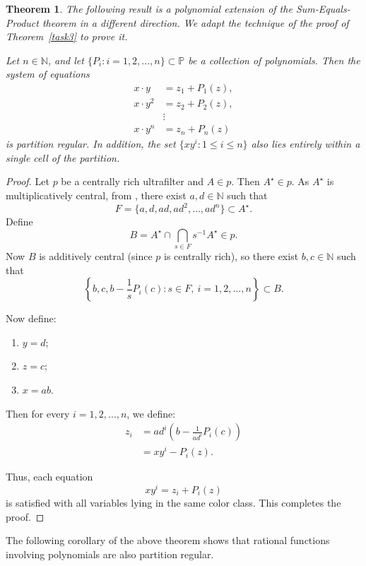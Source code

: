 \documentclass{article}
\theoremstyle{Theorem}
\newtheorem{thm}{Theorem}[section]
\theoremstyle{definition}
\newcommand{\Po}{\mathbb{P}}
\begin{document}
\begin{thm}
The following result is a polynomial extension of the Sum-Equals-Product theorem in a different direction. We adapt the technique of the proof of Theorem~\ref{task3} to prove it.

Let \( n \in \mathbb{N} \), and let \( \{P_i : i = 1, 2, \ldots, n\} \subset \Po \) be a collection of polynomials. Then the system of equations 
\[
\begin{aligned}
x \cdot y &= z_1 + P_1(z), \\
x \cdot y^2 &= z_2 + P_2(z), \\
&\vdots \\
x \cdot y^n &= z_n + P_n(z)
\end{aligned}
\]
is partition regular. In addition, the set \( \{ x y^i : 1 \leq i \leq n \} \) also lies entirely within a single cell of the partition.
\end{thm}

\begin{proof}
Let \( p \) be a centrally rich ultrafilter and \( A \in p \). Then \( A^\star \in p \). As \( A^\star \) is multiplicatively central, from \cite[Corollary 2.7]{tran}, there exist \( a, d \in \mathbb{N} \) such that 
\[
F = \{ a, d, ad, ad^2, \ldots, ad^n \} \subset A^\star.
\] 
Define 
\[
B = A^\star \cap \bigcap_{s \in F} s^{-1} A^\star \in p.
\] 
Now \( B \) is additively central (since \( p \) is centrally rich), so there exist \( b, c \in \mathbb{N} \) such that 
\[
\left\{ b, c, b - \frac{1}{s} P_i(c) : s \in F,\ i = 1, 2, \ldots, n \right\} \subset B.
\]

Now define:
\begin{enumerate}
    \item \( y = d \);
    \item \( z = c \);
    \item \( x = ab \).
\end{enumerate}

Then for every \( i = 1, 2, \ldots, n \), we define:
\[
\begin{aligned}
z_i &= ad^i \left( b - \frac{1}{ad^i} P_i(c) \right) \\
&= x y^i - P_i(z).
\end{aligned}
\]

Thus, each equation
\[
x y^i = z_i + P_i(z)
\]
is satisfied with all variables lying in the same color class. This completes the proof.
\end{proof}

The following corollary of the above theorem shows that rational functions involving polynomials are also partition regular.
\end{document}

